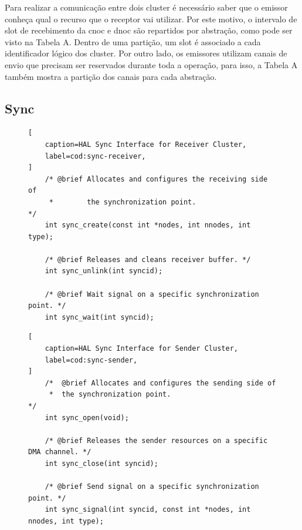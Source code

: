     Para realizar a comunicação entre dois cluster é necessário saber
    que o emissor conheça qual o recurso que o receptor vai utilizar.
    Por este motivo, o intervalo de slot de recebimento da cnoc e dnoc
    são repartidos por abstração, como pode ser visto na Tabela A.
    Dentro de uma partição, um slot é associado a cada identificador lógico dos cluster.
    Por outro lado, os emissores utilizam canais de envio que precisam
    ser reservados durante toda a operação, para isso, a Tabela A também mostra
    a partição dos canais para cada abstração.

    \subsection{Sync}


\begin{figure}[t]
\begin{lstlisting}[
    caption=HAL Sync Interface for Receiver Cluster,
    label=cod:sync-receiver,
]
    /* @brief Allocates and configures the receiving side of
     *        the synchronization point.                     */
    int sync_create(const int *nodes, int nnodes, int type);

    /* @brief Releases and cleans receiver buffer. */
    int sync_unlink(int syncid);

    /* @brief Wait signal on a specific synchronization point. */
    int sync_wait(int syncid);
\end{lstlisting}
\end{figure}

\begin{figure}[t]
\begin{lstlisting}[
    caption=HAL Sync Interface for Sender Cluster,
    label=cod:sync-sender,
]
    /*  @brief Allocates and configures the sending side of
     *  the synchronization point.                          */
    int sync_open(void);

    /* @brief Releases the sender resources on a specific DMA channel. */
    int sync_close(int syncid);

    /* @brief Send signal on a specific synchronization point. */
    int sync_signal(int syncid, const int *nodes, int nnodes, int type);
\end{lstlisting}
\end{figure}

